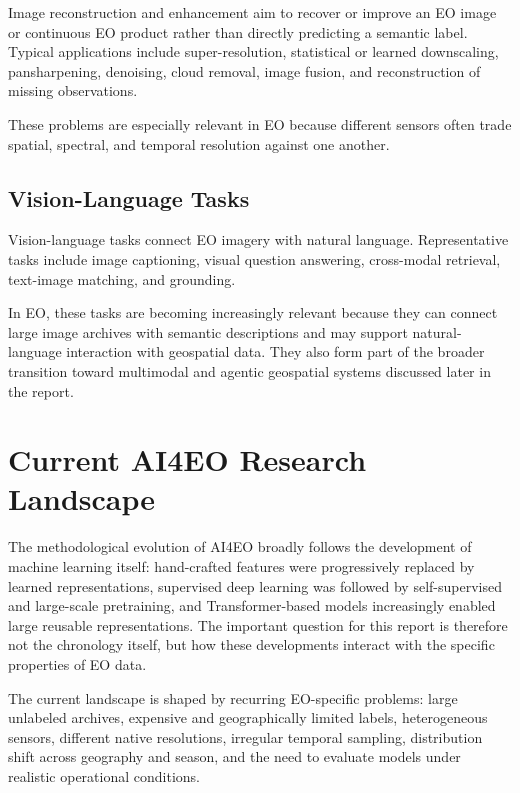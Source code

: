 \documentclass[
    11pt,
    a4paper,
    parskip=half,
    bibliography=totoc,
    numbers=noenddot
]{scrartcl}
\begin{document}
Image reconstruction and enhancement aim to recover or improve an EO
image or continuous EO product rather than directly predicting a
semantic label. Typical applications include super-resolution,
statistical or learned downscaling, pansharpening, denoising, cloud
removal, image fusion, and reconstruction of missing observations.

These problems are especially relevant in EO because different sensors
often trade spatial, spectral, and temporal resolution against one
another.

\subsection{Vision-Language Tasks}

Vision-language tasks connect EO imagery with natural language.
Representative tasks include image captioning, visual question answering,
cross-modal retrieval, text-image matching, and grounding.

In EO, these tasks are becoming increasingly relevant because they can
connect large image archives with semantic descriptions and may support
natural-language interaction with geospatial data. They also form part
of the broader transition toward multimodal and agentic geospatial
systems discussed later in the report.

\section{Current AI4EO Research Landscape}

The methodological evolution of AI4EO broadly follows the development of
machine learning itself: hand-crafted features were progressively
replaced by learned representations, supervised deep learning was
followed by self-supervised and large-scale pretraining, and
Transformer-based models increasingly enabled large reusable
representations. The important question for this report is therefore not
the chronology itself, but how these developments interact with the
specific properties of EO data.

The current landscape is shaped by recurring EO-specific problems:
large unlabeled archives, expensive and geographically limited labels,
heterogeneous sensors, different native resolutions, irregular temporal
sampling, distribution shift across geography and season, and the need
to evaluate models under realistic operational conditions.
\end{document}
